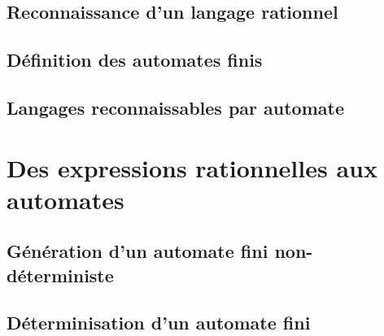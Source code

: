 \documentclass[9pt]{beamer}
\begin{document}
\subsection{Reconnaissance d'un langage rationnel}





 
\subsection{Définition des automates finis}






 
\subsection{Langages reconnaissables par automate}







 
\section{Des expressions rationnelles aux automates}
 
\subsection{Génération d'un automate fini non-déterministe}






 
\subsection{Déterminisation d'un automate fini}






 
\end{document}

